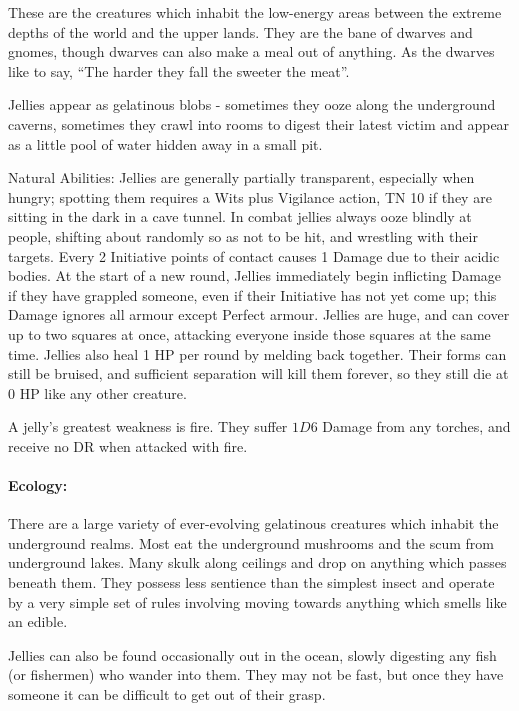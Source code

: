 \begin{multicols}{2}

These are the creatures which inhabit the low-energy areas between the extreme depths of the world and the upper lands.  They are the bane of dwarves and gnomes, though dwarves can also make a meal out of anything.  As the dwarves like  to say, ``The harder they fall the sweeter the meat''.

Jellies appear as gelatinous blobs - sometimes they ooze along the underground caverns, sometimes they crawl into rooms to digest their latest victim and appear as a little pool of water hidden away in a small pit.

Natural Abilities: Jellies are generally partially transparent, especially when hungry; spotting them requires a Wits plus Vigilance action, TN 10 if they are sitting in the dark in a cave tunnel.  In combat jellies always ooze blindly at people, shifting about randomly so as not to be hit, and wrestling with their targets.  Every 2 Initiative points of contact causes 1 Damage due to their acidic bodies.  At the start of a new round, Jellies immediately begin inflicting Damage if they have grappled someone, even if their Initiative has not yet come up; this Damage ignores all armour except Perfect armour.  Jellies are huge, and can cover up to two squares at once, attacking everyone inside those squares at the same time.  Jellies also heal 1 HP per round by melding back together.  Their forms can still be bruised, and sufficient separation will kill them forever, so they still die at 0 HP like any other creature.

A jelly's greatest weakness is fire.  They suffer $1D6$ Damage from any torches, and receive no DR when attacked with fire.

\label{jelly}
\paragraph{Ecology:} There are a large variety of ever-evolving gelatinous creatures which inhabit the underground realms.  Most eat the underground mushrooms and the scum from underground lakes.  Many skulk along ceilings and drop on anything which passes beneath them.  They possess less sentience than the simplest insect and operate by a very simple set of rules involving moving towards anything which smells like an edible.

Jellies can also be found occasionally out in the ocean, slowly digesting any fish (or fishermen) who wander into them.  They may not be fast, but once they have someone it can be difficult to get out of their grasp.


\end{multicols}
